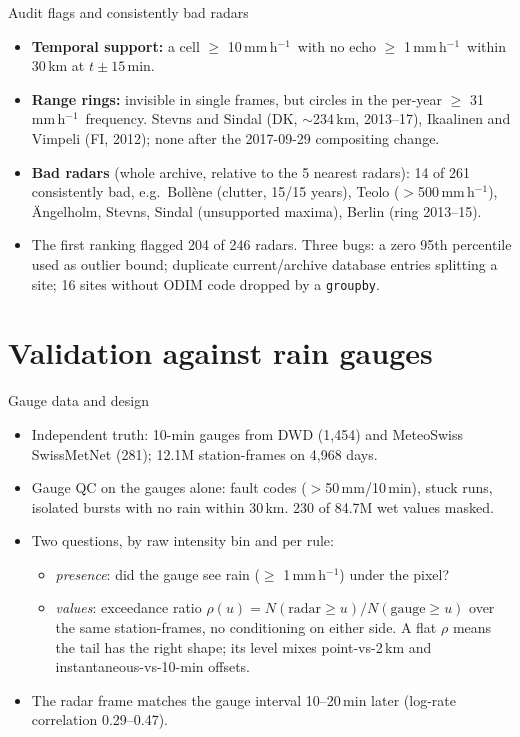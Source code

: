 \documentclass[aspectratio=169,10pt]{beamer}
\newcommand{\mmh}{\,mm\,h$^{-1}$}
\newcommand{\code}[1]{\texttt{\small #1}}
\begin{document}
\begin{frame}{Audit flags and consistently bad radars}
  \small
  \begin{itemize}
    \item \textbf{Temporal support:} a cell $\ge$ 10\mmh\ with no echo $\ge$ 1\mmh\ within
      30\,km at $t\pm15$\,min.
    \item \textbf{Range rings:} invisible in single frames, but circles in the per-year
      $\ge$ 31\mmh\ frequency. Stevns and Sindal (DK, $\sim$234\,km, 2013--17), Ikaalinen and
      Vimpeli (FI, 2012); none after the 2017-09-29 compositing change.
    \item \textbf{Bad radars} (whole archive, relative to the 5 nearest radars): 14 of 261
      consistently bad, e.g.\ Bollène (clutter, 15/15 years), Teolo ($>$500\mmh), Ängelholm,
      Stevns, Sindal (unsupported maxima), Berlin (ring 2013--15).
    \item The first ranking flagged 204 of 246 radars. Three bugs: a zero 95th percentile used
      as outlier bound; duplicate current/archive database entries splitting a site; 16 sites
      without ODIM code dropped by a \code{groupby}.
  \end{itemize}
\end{frame}

\section{Validation against rain gauges}

\begin{frame}{Gauge data and design}
  \small
  \begin{itemize}
    \item Independent truth: 10-min gauges from DWD (1,454) and MeteoSwiss SwissMetNet (281);
      12.1M station-frames on 4,968 days.
    \item Gauge QC on the gauges alone: fault codes ($>$50\,mm/10\,min), stuck runs,
      isolated bursts with no rain within 30\,km. 230 of 84.7M wet values masked.
    \item Two questions, by raw intensity bin and per rule:
      \begin{itemize}
        \item \emph{presence}: did the gauge see rain ($\ge$ 1\mmh) under the pixel?
        \item \emph{values}: exceedance ratio
          $\rho(u) = N(\text{radar} \ge u) / N(\text{gauge} \ge u)$ over the same
          station-frames, no conditioning on either side. A flat $\rho$ means the tail has the
          right shape; its level mixes point-vs-2\,km and instantaneous-vs-10-min offsets.
      \end{itemize}
    \item The radar frame matches the gauge interval 10--20\,min later (log-rate correlation
      0.29--0.47).
  \end{itemize}
\end{frame}
\end{document}
